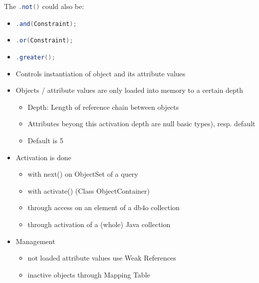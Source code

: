 \begin{breakbox}
\end{breakbox}

\begin{breakbox}
\end{breakbox}

\begin{breakbox}
\end{breakbox}

\begin{breakbox}
The \lstinline[language=Java]{.not()} could also be:
\begin{itemize}
	\item \lstinline[language=Java]{.and(Constraint);}
	\item \lstinline[language=Java]{.or(Constraint);}
	\item \lstinline[language=Java]{.greater();}
\end{itemize}
\end{breakbox}

\begin{breakbox}
\begin{itemize}
	\item Controls instantiation of object and its attribute values
	\item Objects / attribute values are only loaded into memory to a certain depth
		\begin{itemize}
			\item Depth: Length of reference chain between objects
			\item Attributes beyong this activation depth are null basic types), resp. default
			\item Default is 5
		\end{itemize}
	\item Activation is done
		\begin{itemize}
			\item with next() on ObjectSet of a query
			\item with activate() (Class ObjectContainer)
			\item through access on an element of a db4o collection
			\item through activation of a (whole) Java collection
		\end{itemize}
	\item Management
		\begin{itemize}
			\item not loaded attribute values use Weak References
			\item inactive objects through Mapping Table
		\end{itemize}
\end{itemize}
\end{breakbox}
